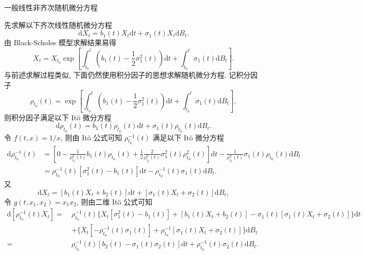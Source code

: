 \documentclass[openany]{ctexbook}
\theoremstyle{kaiti}
\theoremstyle{normal}
\begin{document}
一般线性非齐次随机微分方程

先求解以下齐次线性随机微分方程
\begin{equation}
  \mathrm{d}X_t=b_1(t) X_t\mathrm{d}t+\sigma_1(t) X_t\mathrm{d}B_t.
\end{equation}
由 Black-Scholes 模型求解结果易得
\begin{equation}
  X_t=X_{t_0}\exp\left[\int_{t_0}^t\left(b_1(t)-\frac{1}{2}\sigma_1^2(t)\right)\mathrm{d}t+\int_{t_0}^t\sigma_1(t) \mathrm{d}B_t\right].
\end{equation}
与前述求解过程类似, 下面仍然使用积分因子的思想求解随机微分方程. 记积分因子
\begin{equation}
  \rho_{t_0}(t)=\exp\left[\int_{t_0}^t\left(b_1(t)-\frac{1}{2}\sigma_1^2(t)\right)\mathrm{d}t+\int_{t_0}^t\sigma_1(t) \mathrm{d}B_t\right],
\end{equation}
则积分因子满足以下 It\"o 微分方程
\begin{equation}
  \mathrm{d}\rho_{t_0}(t)=b_1(t) \rho_{t_0}(t)\mathrm{d}t+\sigma_1(t) \rho_{t_0}(t)\mathrm{d}B_t.
\end{equation}
令 $f(t,x)=1/x$, 则由 It\"o 公式可知 $\rho_{t_0}^{-1}(t)$ 满足以下 It\"o 微分方程
\begin{equation}
  \begin{aligned}
    \mathrm{d}\rho_{t_0}^{-1}(t)
    &=\left[0-\frac{1}{\rho_{t_0}^2(t)}b_1(t) \rho_{t_0}(t)+\frac{1}{2}\frac{2}{\rho_{t_0}^3(t)}\sigma_1^2(t) \rho_{t_0}^2(t)\right]\mathrm{d}t-\frac{1}{\rho_{t_0}^2(t)}\sigma_1(t) \rho_{t_0}(t)\mathrm{d}B_t\\
    &=\rho_{t_0}^{-1}(t)[\sigma_1^2(t)-b_1(t)]\mathrm{d}t-\rho_{t_0}^{-1}(t)\sigma_1(t)\mathrm{d}B_t.
  \end{aligned}
\end{equation}
又
\begin{equation}
  \mathrm{d}X_t=[b_1(t) X_t+b_2(t)]\mathrm{d}t+[\sigma_1(t) X_t+\sigma_2(t)]\mathrm{d}B_t,
\end{equation}
令 $g(t,x_1,x_2)=x_1x_2$, 则由二维 It\"o 公式可知
\begin{equation}
  \begin{aligned}
    \mathrm{d}[\rho_{t_0}^{-1}(t)X_t]
    =~&\rho_{t_0}^{-1}(t)\Big\{X_t[\sigma_1^2(t)-b_1(t)]+[b_1(t) X_t+b_2(t)]-\sigma_1(t)[\sigma_1(t) X_t+\sigma_2(t)]\Big\}\mathrm{d}t\\
    &+\Big\{X_t[-\rho_{t_0}^{-1}(t)\sigma_1(t)]+\rho_{t_0}^{-1}[\sigma_1(t) X_t+\sigma_2(t)]\Big\}\mathrm{d}B_t\\
    =~&\rho_{t_0}^{-1}(t)[b_2(t)-\sigma_1(t)\sigma_2(t)]\mathrm{d}t+\rho_{t_0}^{-1}(t)\sigma_2(t)\mathrm{d}B_t.\\
  \end{aligned}
\end{equation}
\end{document}
